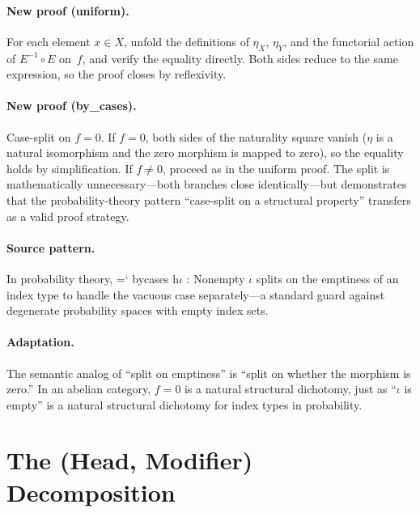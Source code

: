 \documentclass[11pt]{article}
\renewcommand{\texttt}[1]{%
  \begingroup\ttfamily\hyphenchar\font=`\-\relax
  \def\_{\textunderscore\discretionary{}{}{}}%
  #1\endgroup}
\theoremstyle{definition}
\theoremstyle{remark}
\begin{document}
\paragraph{New proof (uniform).}
For each element $x \in X$, unfold the definitions of $\eta_X$,
$\eta_Y$, and the functorial action of $E^{-1} \circ E$ on~$f$, and
verify the equality directly.  Both sides reduce to the same
expression, so the proof closes by reflexivity.

\paragraph{New proof (by\_cases).}
Case-split on $f = 0$.  If $f = 0$, both sides of the naturality
square vanish ($\eta$ is a natural isomorphism and the zero
morphism is mapped to zero), so the equality holds by
simplification.  If $f \neq 0$, proceed as in the uniform proof.
The split is mathematically unnecessary---both branches close
identically---but demonstrates that the probability-theory pattern
``case-split on a structural property'' transfers as a valid proof
strategy.

\paragraph{Source pattern.}  In probability theory, \texttt{by\_cases h$\iota$ :
Nonempty $\iota$} splits on the emptiness of an index type to handle the
vacuous case separately---a standard guard against degenerate
probability spaces with empty index sets.

\paragraph{Adaptation.}  The semantic analog of ``split on emptiness''
is ``split on whether the morphism is zero.''  In an abelian category,
$f = 0$ is a natural structural dichotomy, just as
``$\iota$ is empty'' is a natural structural dichotomy for index types
in probability.

\section{The (Head, Modifier) Decomposition}\label{sec:finding}
\end{document}
